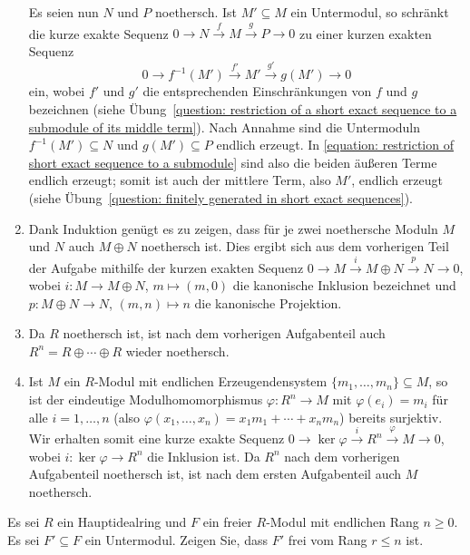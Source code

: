 \begin{solution}
\begin{enumerate}
      Es seien nun $N$ und $P$ noethersch.
      Ist $M' \subseteq M$ ein Untermodul, so schränkt die kurze exakte Sequenz $0 \to N \xrightarrow{f} M \xrightarrow{g} P \to 0$ zu einer kurzen exakten Sequenz
      \begin{equation}
        \label{equation: restriction of short exact sequence to a submodule}
        0 \to f^{-1}(M') \xrightarrow{f'} M' \xrightarrow{g'} g(M') \to 0
      \end{equation}
      ein, wobei $f'$ und $g'$ die entsprechenden Einschränkungen von $f$ und $g$ bezeichnen (siehe Übung~\ref{question: restriction of a short exact sequence to a submodule of its middle term}).
      Nach Annahme sind die Untermoduln $f^{-1}(M') \subseteq N$ und $g(M') \subseteq P$ endlich erzeugt.
      In \eqref{equation: restriction of short exact sequence to a submodule} sind also die beiden äußeren Terme endlich erzeugt;
      somit ist auch der mittlere Term, also $M'$, endlich erzeugt (siehe Übung~\ref{question: finitely generated in short exact sequences}).
    \item
      Dank Induktion genügt es zu zeigen, dass für je zwei noethersche Moduln $M$ und $N$ auch $M \oplus N$ noethersch ist.
      Dies ergibt sich aus dem vorherigen Teil der Aufgabe mithilfe der kurzen exakten Sequenz $0 \to M \xrightarrow{i} M \oplus N \xrightarrow{p} N \to 0$, wobei $i \colon M \to M \oplus N$, $m \mapsto (m,0)$ die kanonische Inklusion bezeichnet und $p \colon M \oplus N \to N$, $(m,n) \mapsto n$ die kanonische Projektion.
    \item
      Da $R$ noethersch ist, ist nach dem vorherigen Aufgabenteil auch $R^n = R \oplus \dotsb \oplus R$ wieder noethersch.
    \item
      Ist $M$ ein $R$-Modul mit endlichen Erzeugendensystem $\{m_1, \dotsc, m_n\} \subseteq M$, so ist der eindeutige Modulhomomorphismus $\varphi \colon R^n \to M$ mit $\varphi(e_i) = m_i$ für alle $i = 1, \dotsc, n$ (also $\varphi(x_1, \dotsc, x_n) = x_1 m_1 + \dotsb + x_n m_n$) bereits surjektiv.
      Wir erhalten somit eine kurze exakte Sequenz $0 \to \ker \varphi \xrightarrow{i} R^n \xrightarrow{\varphi} M \to 0$, wobei $i \colon \ker \varphi \to R^n$ die Inklusion ist.
      Da $R^n$ nach dem vorherigen Aufgabenteil noethersch ist, ist nach dem ersten Aufgabenteil auch $M$ noethersch.
  \end{enumerate}
\end{solution}


\begin{question}[subtitle = Untermoduln freier Moduln über Hauptidealringen]
  \label{question: submodules of free modules over pid are also free}
  Es sei $R$ ein Hauptidealring und $F$ ein freier $R$-Modul mit endlichen Rang $n \geq 0$.
  Es sei $F' \subseteq F$ ein Untermodul.
  Zeigen Sie, dass $F'$ frei vom Rang $r \leq n$ ist.
\end{question}


